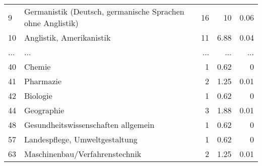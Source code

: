 \begin{longtable}{lXrrr}
        9 & \multicolumn{1}{X}{Germanistik (Deutsch, germanische Sprachen ohne Anglistik)} & %
          \num{16} &
          \num[round-mode=places,round-precision=2]{10} &
          \num[round-mode=places,round-precision=2]{0,06} \\
        10 & \multicolumn{1}{X}{Anglistik, Amerikanistik} & %
          \num{11} &
          \num[round-mode=places,round-precision=2]{6,88} &
          \num[round-mode=places,round-precision=2]{0,04} \\
       ... & ... & ... & ... & ... \\
        40 & \multicolumn{1}{X}{Chemie} & %
          \num{1} &
          \num[round-mode=places,round-precision=2]{0,62} &
          \num[round-mode=places,round-precision=2]{0} \\

        41 & \multicolumn{1}{X}{Pharmazie} & %
          \num{2} &
          \num[round-mode=places,round-precision=2]{1,25} &
          \num[round-mode=places,round-precision=2]{0,01} \\

        42 & \multicolumn{1}{X}{Biologie} & %
          \num{1} &
          \num[round-mode=places,round-precision=2]{0,62} &
          \num[round-mode=places,round-precision=2]{0} \\

        44 & \multicolumn{1}{X}{Geographie} & %
          \num{3} &
          \num[round-mode=places,round-precision=2]{1,88} &
          \num[round-mode=places,round-precision=2]{0,01} \\

        48 & \multicolumn{1}{X}{Gesundheitswissenschaften allgemein} & %
          \num{1} &
          \num[round-mode=places,round-precision=2]{0,62} &
          \num[round-mode=places,round-precision=2]{0} \\

        57 & \multicolumn{1}{X}{Landespflege, Umweltgestaltung} & %
          \num{1} &
          \num[round-mode=places,round-precision=2]{0,62} &
          \num[round-mode=places,round-precision=2]{0} \\

        63 & \multicolumn{1}{X}{Maschinenbau/Verfahrenstechnik} & %
          \num{2} &
          \num[round-mode=places,round-precision=2]{1,25} &
          \num[round-mode=places,round-precision=2]{0,01} \\


\end{longtable}

